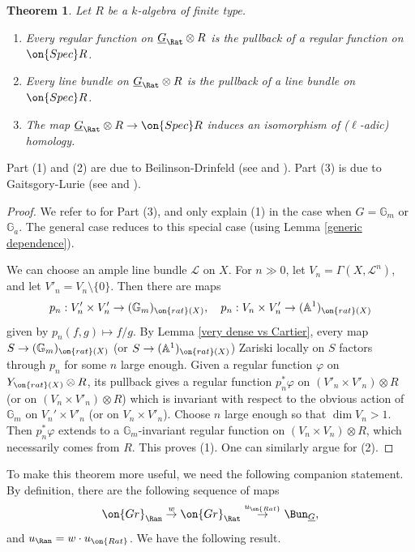 \documentclass[]{pcmi}
\theoremstyle{plain}
\newtheorem{thm}[equation]{Theorem}
\theoremstyle{remark}
\theoremstyle{definition}
\newcommand{\bA}{{\mathbb A}}
\newcommand{\bG}{{\mathbb G}}
\newcommand{\mL}{{\mathcal L}}
\newcommand{\Gr}{{\on{Gr}}}
\newcommand{\Spec}{\on{Spec}}
\begin{document}
\begin{thm} Let $R$ be a $k$-algebra of finite type.
\begin{enumerate}
\item[(1)] Every regular function on $\underline G_{\Rat}\otimes R$ is the pullback of a regular function on $\Spec R$.
\item[(2)] Every line bundle on  $\underline G_{\Rat}\otimes R$ is the pullback of a line bundle on $\Spec R$.
\item[(3)] The map $\underline G_{\Rat}\otimes R\to \Spec R$ induces an isomorphism of ($\ell$-adic) homology. 
\end{enumerate}
\end{thm}
Part (1) and (2) are due to Beilinson-Drinfeld (see \cite[Proposition 4.3.13]{BD} and \cite[\S~4.9.1]{BD0}). Part (3) is due to Gaitsgory-Lurie (see \cite{Ga3} and \cite[Theorem 3.3.1]{GL}). 
\begin{proof}We refer to \cite{GL} for Part (3), and only explain (1)
in the case when $G=\bG_m$ or $\bG_a$. The general case reduces to this special case (using Lemma \ref{generic dependence}). 

We can choose an ample line bundle $\mL$ on $X$. For $n\gg 0$, let $V_n=\Gamma(X,\mL^n)$, and let $V'_n= V_n\setminus \{0\}$. Then there are maps 
$$p_n:V'_n\times V'_n\to (\bG_m)_{\on{rat}(X)},\quad  p_n:V_n\times V'_n\to (\bA^1)_{\on{rat}(X)}$$ given by $p_n(f,g)\mapsto f/g$. By Lemma \ref{very dense vs Cartier}, every map $S\to (\bG_m)_{\on{rat}(X)}$ (or $S\to (\bA^1)_{\on{rat}(X)}$) Zariski locally on $S$ factors through $p_n$ for some $n$ large enough.
Given a regular function $\varphi$ on $Y_{\on{rat}(X)}\otimes R$, its pullback gives a regular function $p_n^*\varphi$ on $(V'_n\times V'_n)\otimes R$ (or on $(V_n\times V'_n)\otimes R$) which is invariant with respect to the obvious action of $\bG_m$ on $V_n'\times V'_n$ (or on $V_n\times V'_n$). Choose $n$ large enough so that $\dim V_n>1$. Then $p_n^*\varphi$ extends to a $\bG_m$-invariant regular function on $(V_n\times V_n)\otimes R$, which necessarily comes from $R$. This proves (1). One can similarly argue for (2).
 \end{proof}

To make this theorem more useful, we need the following companion statement.
By definition, there are the following sequence of maps
 \[\Gr_{\Ran}\stackrel{w}{\to} \Gr_{\Rat}\stackrel{u_{\on{Rat}}}{\to} \Bun_{\underline G},\]
and $u_{\Ran}=w\cdot u_{\on{Rat}}$. 
We have the following result.
\end{document}
